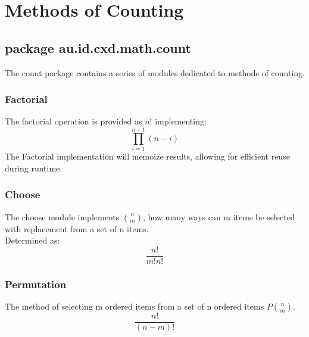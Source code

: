 
\section{Methods of Counting}

\subsection{package au.id.cxd.math.count}

The count package contains a series of modules dedicated to methods of counting.

\subsubsection{Factorial}

The factorial operation is provided as $n!$ implementing:
$$
\prod_{i=1}^{n-1} (n-i)
$$
The Factorial implementation will memoize results, allowing for efficient reuse during runtime. 

\subsubsection{Choose}

The choose module implements $n \choose m$, how many ways can m items be selected with replacement from a set of n items. \\
Determined as:
$$
\frac{n!}{m!n!}
$$

\subsubsection{Permutation}

The method of selecting m ordered items from a set of n ordered items $P {n \choose m}$.\\
$$
\frac{n!}{(n-m)!}
$$

